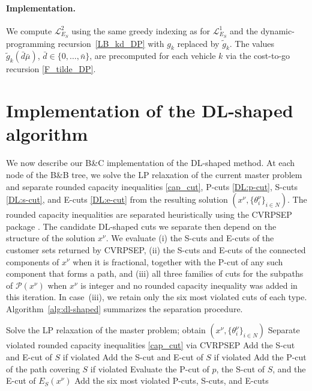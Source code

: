 \documentclass{article}
\begin{document}
\paragraph{Implementation.}
We compute $\mathcal{L}^2_{E_S}$ using the same greedy indexing as for $\mathcal{L}^1_{E_S}$ and the dynamic-programming recursion~\eqref{LB_kd_DP} with $g_k$ replaced by $\widetilde{g}_k$. The values $\widetilde{g}_k(\bar d \bar\mu)$, $\bar d \in \{0, \dots, \bar n\}$, are precomputed for each vehicle $k$ via the cost-to-go recursion \eqref{F_tilde_DP}.


\section{Implementation of the DL-shaped algorithm} \label{sec:implementation}


We now describe our B\&C implementation of the DL-shaped method. At each node of the B\&B tree, we solve the LP relaxation of the current master problem and separate rounded capacity inequalities \eqref{cap_cut}, P-cuts \eqref{DL:p-cut}, S-cuts \eqref{DL:s-cut}, and E-cuts \eqref{DL:e-cut} from the resulting solution $(x^\nu, \{\theta_i^\nu\}_{i \in N})$. The rounded capacity inequalities are separated heuristically using the CVRPSEP package \cite{Lysgaard2003}. The candidate DL-shaped cuts we separate then depend on the structure of the solution $x^\nu$. We evaluate (i) the S-cuts and E-cuts of the customer sets returned by CVRPSEP, (ii) the S-cuts and E-cuts of the connected components of $x^\nu$ when it is fractional, together with the P-cut of any such component that forms a path, and (iii) all three families of cuts for the subpaths of $\mathcal{P}(x^\nu)$ when $x^\nu$ is integer and no rounded capacity inequality was added in this iteration. In case~(iii), we retain only the six most violated cuts of each type. Algorithm~\ref{alg:dl-shaped} summarizes the separation procedure.

\begin{algorithm}[H]
\caption{Separation procedure at a B\&B node}\label{alg:dl-shaped}
\begin{algorithmic}[1]
\State Solve the LP relaxation of the master problem; obtain $(x^\nu, \{\theta_i^\nu\}_{i \in N})$
\State Separate violated rounded capacity inequalities \eqref{cap_cut} via CVRPSEP
    \State Add the S-cut and E-cut of $S$ if violated
\EndFor
{}
        \State Add the S-cut and E-cut of $S$ if violated
            \State Add the P-cut of the path covering $S$ if violated
        \EndIf
    \EndFor
{}
        \State Evaluate the P-cut of $p$, the S-cut of $S$, and the E-cut of $E_S(x^\nu)$
    \EndFor
    \State Add the six most violated P-cuts, S-cuts, and E-cuts
\EndIf
\end{algorithmic}
\end{algorithm}
\end{document}
